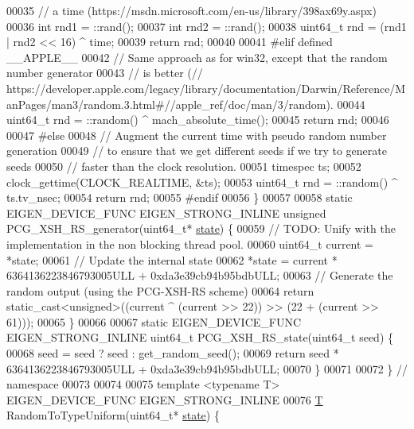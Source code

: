 \begin{DoxyCode}
00035   \textcolor{comment}{// a time (https://msdn.microsoft.com/en-us/library/398ax69y.aspx)}
00036   \textcolor{keywordtype}{int} rnd1 = ::rand();
00037   \textcolor{keywordtype}{int} rnd2 = ::rand();
00038   uint64\_t rnd = (rnd1 | rnd2 << 16) ^ time;
00039   \textcolor{keywordflow}{return} rnd;
00040 
00041 \textcolor{preprocessor}{#elif defined \_\_APPLE\_\_}
00042   \textcolor{comment}{// Same approach as for win32, except that the random number generator}
00043   \textcolor{comment}{// is better (//
       https://developer.apple.com/legacy/library/documentation/Darwin/Reference/ManPages/man3/random.3.html#//apple\_ref/doc/man/3/random).}
00044   uint64\_t rnd = ::random() ^ mach\_absolute\_time();
00045   \textcolor{keywordflow}{return} rnd;
00046 
00047 \textcolor{preprocessor}{#else}
00048   \textcolor{comment}{// Augment the current time with pseudo random number generation}
00049   \textcolor{comment}{// to ensure that we get different seeds if we try to generate seeds}
00050   \textcolor{comment}{// faster than the clock resolution.}
00051   timespec ts;
00052   clock\_gettime(CLOCK\_REALTIME, &ts);
00053   uint64\_t rnd = ::random() ^ ts.tv\_nsec;
00054   \textcolor{keywordflow}{return} rnd;
00055 \textcolor{preprocessor}{#endif}
00056 \}
00057 
00058 \textcolor{keyword}{static} EIGEN\_DEVICE\_FUNC EIGEN\_STRONG\_INLINE \textcolor{keywordtype}{unsigned} PCG\_XSH\_RS\_generator(uint64\_t* 
      \hyperlink{structstate}{state}) \{
00059   \textcolor{comment}{// TODO: Unify with the implementation in the non blocking thread pool.}
00060   uint64\_t current = *state;
00061   \textcolor{comment}{// Update the internal state}
00062   *state = current * 6364136223846793005ULL + 0xda3e39cb94b95bdbULL;
00063   \textcolor{comment}{// Generate the random output (using the PCG-XSH-RS scheme)}
00064   \textcolor{keywordflow}{return} \textcolor{keyword}{static\_cast<}\textcolor{keywordtype}{unsigned}\textcolor{keyword}{>}((current ^ (current >> 22)) >> (22 + (current >> 61)));
00065 \}
00066 
00067 \textcolor{keyword}{static} EIGEN\_DEVICE\_FUNC EIGEN\_STRONG\_INLINE uint64\_t PCG\_XSH\_RS\_state(uint64\_t seed) \{
00068   seed = seed ? seed : get\_random\_seed();
00069   \textcolor{keywordflow}{return} seed * 6364136223846793005ULL + 0xda3e39cb94b95bdbULL;
00070 \}
00071 
00072 \}  \textcolor{comment}{// namespace}
00073 
00074 
00075 \textcolor{keyword}{template} <\textcolor{keyword}{typename} T> EIGEN\_DEVICE\_FUNC EIGEN\_STRONG\_INLINE
00076 \hyperlink{group___sparse_core___module_class_eigen_1_1_triplet}{T} RandomToTypeUniform(uint64\_t* \hyperlink{structstate}{state}) \{

\end{DoxyCode}
